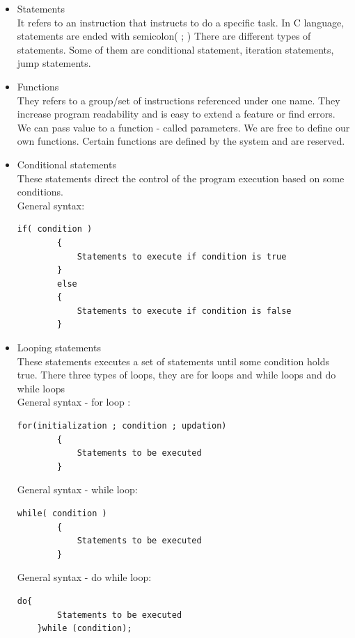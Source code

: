 \begin{itemize}
    \item Statements \\
    It refers to an instruction that instructs to do a specific task. In C language, statements are ended with semicolon( ; ) There are different types of statements. Some of them are conditional statement, iteration statements, jump statements.
    
    \item Functions \\
    They refers to a group/set of instructions referenced under one name. They increase program readability and is easy to extend a feature or find errors. We can pass value to a function - called parameters. We are free to define our own functions. Certain functions are defined by the system and are reserved.
    
    \item Conditional statements \\
    These statements direct the control of the program execution based on some conditions.\\
    General syntax:
    \begin{lstlisting}[style=CStyle]
        if( condition ) 
        {
            Statements to execute if condition is true
        }
        else
        {
            Statements to execute if condition is false
        }
    \end{lstlisting}
    
    \item Looping statements \\
    These statements executes a set of statements until some condition holds true. There three types of loops, they are for loops and while loops and do while loops \\
    General syntax - for loop :
    \begin{lstlisting}[style=CStyle]
        for(initialization ; condition ; updation) 
        {
            Statements to be executed
        }
    \end{lstlisting}
    General syntax - while loop:
    \begin{lstlisting}[style=CStyle]
        while( condition ) 
        {
            Statements to be executed
        }
    \end{lstlisting}
    General syntax - do while loop:
    \begin{lstlisting}[style=CStyle]
    do{
        Statements to be executed
    }while (condition);
    \end{lstlisting}
    

\end{itemize}
